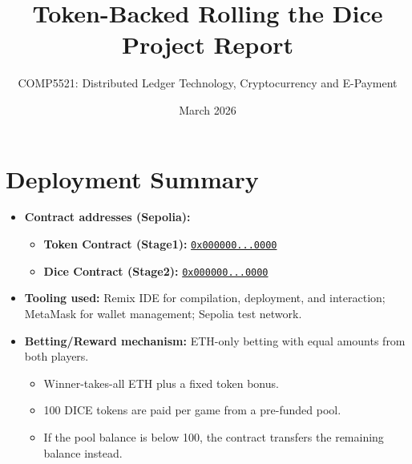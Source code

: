 \documentclass[10pt,a4paper]{article}
\title{Token-Backed Rolling the Dice\\Project Report}
\author{COMP5521: Distributed Ledger Technology, Cryptocurrency and E-Payment}
\date{March 2026}
\newcommand{\txph}{\textcolor{red}{\href{https://sepolia.etherscan.io/tx/0x0000000000000000000000000000000000000000000000000000000000000000}{\texttt{0x000000...0000}}}}
\begin{document}
\maketitle

\section{Deployment Summary}
\begin{itemize}
  \item \textbf{Contract addresses (Sepolia):}
  \begin{itemize}
    \item \textbf{Token Contract (Stage1):} \txph
    \item \textbf{Dice Contract (Stage2):} \txph
  \end{itemize}
  \item \textbf{Tooling used:} Remix IDE for compilation, deployment, and interaction; MetaMask for wallet management; Sepolia test network.
  \item \textbf{Betting/Reward mechanism:} ETH-only betting with equal amounts from both players.
  \begin{itemize}
    \item Winner-takes-all ETH plus a fixed token bonus.
    \item 100 DICE tokens are paid per game from a pre-funded pool.
    \item If the pool balance is below 100, the contract transfers the remaining balance instead.
  \end{itemize}
\end{itemize}
\end{document}

